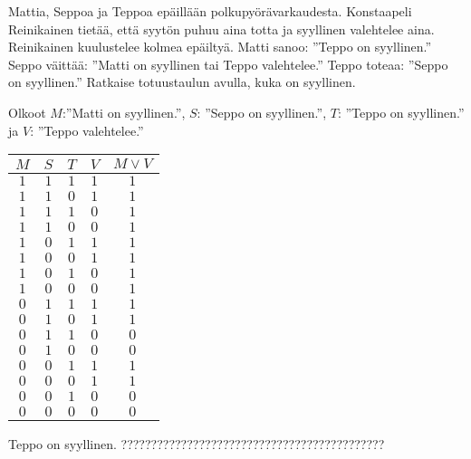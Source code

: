\begin{tehtava}
     Mattia, Seppoa ja Teppoa epäillään polkupyörävarkaudesta. Konstaapeli Reinikainen tietää, että syytön puhuu aina totta ja syyllinen valehtelee aina. Reinikainen kuulustelee kolmea epäiltyä. Matti sanoo: ''Teppo on syyllinen.'' Seppo väittää: ''Matti on syyllinen tai Teppo valehtelee.'' Teppo toteaa: ''Seppo on syyllinen.'' Ratkaise totuustaulun avulla, kuka on syyllinen. 
    \begin{vastaus}
      Olkoot $M$:''Matti on syyllinen.'', $S$: ''Seppo on syyllinen.'', $T$: ''Teppo on syyllinen.'' ja $V$: ''Teppo valehtelee.''
      \begin{center}
		    \begin{tabular}{|c|c|c|c|c|}\hline
		    $M$ & $S$ & $T$ & $V$ & $M\lor V$ \\ \hline
		    $1$ & $1$ & $1$ & $1$ & $1$ \\ %
		    $1$ & $1$ & $0$ & $1$ & $1$ \\
		    $1$ & $1$ & $1$ & $0$ & $1$ \\
		    $1$ & $1$ & $0$ & $0$ & $1$ \\
		    $1$ & $0$ & $1$ & $1$ & $1$ \\
		    $1$ & $0$ & $0$ & $1$ & $1$ \\
		    $1$ & $0$ & $1$ & $0$ & $1$ \\
		    $1$ & $0$ & $0$ & $0$ & $1$ \\
		    $0$ & $1$ & $1$ & $1$ & $1$ \\
		    $0$ & $1$ & $0$ & $1$ & $1$ \\
		    $0$ & $1$ & $1$ & $0$ & $0$ \\
		    $0$ & $1$ & $0$ & $0$ & $0$ \\
		    $0$ & $0$ & $1$ & $1$ & $1$ \\
		    $0$ & $0$ & $0$ & $1$ & $1$ \\
		    $0$ & $0$ & $1$ & $0$ & $0$ \\
		    $0$ & $0$ & $0$ & $0$ & $0$ \\ \hline
\end{tabular}
\end{center}
Teppo on syyllinen. ???????????????????????????????????????????? %
    \end{vastaus}
    
\end{tehtava}


